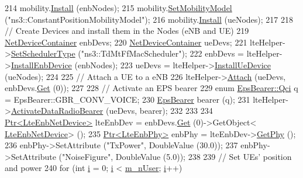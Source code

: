 \begin{DoxyCode}
214   mobility.\hyperlink{classns3_1_1MobilityHelper_a07737960ee95c0777109cf2994dd97ae}{Install} (enbNodes);
215   mobility.\hyperlink{classns3_1_1MobilityHelper_a030275011b6f40682e70534d30280aba}{SetMobilityModel} (\textcolor{stringliteral}{"ns3::ConstantPositionMobilityModel"});
216   mobility.\hyperlink{classns3_1_1MobilityHelper_a07737960ee95c0777109cf2994dd97ae}{Install} (ueNodes);
217 
218   \textcolor{comment}{// Create Devices and install them in the Nodes (eNB and UE)}
219   \hyperlink{classns3_1_1NetDeviceContainer}{NetDeviceContainer} enbDevs;
220   \hyperlink{classns3_1_1NetDeviceContainer}{NetDeviceContainer} ueDevs;
221   lteHelper->\hyperlink{classns3_1_1LteHelper_a8f86e55b8b80a81732c4b2df00fb25d5}{SetSchedulerType} (\textcolor{stringliteral}{"ns3::TdMtFfMacScheduler"});
222   enbDevs = lteHelper->\hyperlink{classns3_1_1LteHelper_a5e009ad35ef85f46b5a6099263f15a03}{InstallEnbDevice} (enbNodes);
223   ueDevs = lteHelper->\hyperlink{classns3_1_1LteHelper_ac9cd932d7de92811cfa953c2e3b2fc9f}{InstallUeDevice} (ueNodes);
224 
225   \textcolor{comment}{// Attach a UE to a eNB}
226   lteHelper->\hyperlink{classns3_1_1LteHelper_a9466743f826aa2652a87907b7f0a1c87}{Attach} (ueDevs, enbDevs.\hyperlink{classns3_1_1NetDeviceContainer_a677d62594b5c9d2dea155cc5045f4d0b}{Get} (0));
227 
228   \textcolor{comment}{// Activate an EPS bearer}
229   \textcolor{keyword}{enum} \hyperlink{structns3_1_1EpsBearer_aecf0c67109c5eb4ec0b07226fff5885e}{EpsBearer::Qci} q = EpsBearer::GBR\_CONV\_VOICE;
230   \hyperlink{structns3_1_1EpsBearer}{EpsBearer} bearer (q);
231   lteHelper->\hyperlink{classns3_1_1LteHelper_ac896e16cf162e4beeaa292d39ab1b700}{ActivateDataRadioBearer} (ueDevs, bearer);
232   
233  
234   \hyperlink{classns3_1_1Ptr}{Ptr<LteEnbNetDevice>} lteEnbDev = enbDevs.\hyperlink{classns3_1_1NetDeviceContainer_a677d62594b5c9d2dea155cc5045f4d0b}{Get} (0)->GetObject<
      \hyperlink{classns3_1_1LteEnbNetDevice}{LteEnbNetDevice}> ();
235   \hyperlink{classns3_1_1Ptr}{Ptr<LteEnbPhy>} enbPhy = lteEnbDev->\hyperlink{classns3_1_1LteEnbNetDevice_a58db72130e0740f16a5e03b22e4a10a4}{GetPhy} ();
236   enbPhy->SetAttribute (\textcolor{stringliteral}{"TxPower"}, DoubleValue (30.0));
237   enbPhy->SetAttribute (\textcolor{stringliteral}{"NoiseFigure"}, DoubleValue (5.0));
238 
239   \textcolor{comment}{// Set UEs' position and power}
240   \textcolor{keywordflow}{for} (\textcolor{keywordtype}{int} \hyperlink{bernuolliDistribution_8m_a6f6ccfcf58b31cb6412107d9d5281426}{i} = 0; \hyperlink{bernuolliDistribution_8m_a6f6ccfcf58b31cb6412107d9d5281426}{i} < \hyperlink{classLenaTdMtFfMacSchedulerTestCase_a6e18eed688f5b1caee075826c8844267}{m\_nUser}; \hyperlink{bernuolliDistribution_8m_a6f6ccfcf58b31cb6412107d9d5281426}{i}++)

\end{DoxyCode}
